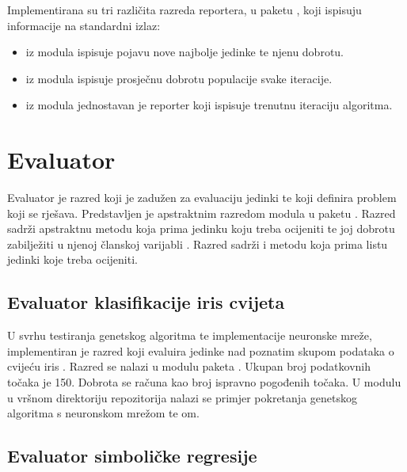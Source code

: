 \documentclass[times, utf8, zavrsni, numeric]{fer}
\begin{document}
Implementirana su tri različita razreda reportera, u paketu ,
koji ispisuju informacije na standardni izlaz:
\begin{itemize}
    \item {} iz modula
         ispisuje pojavu nove najbolje
        jedinke te njenu dobrotu.
    \item {} iz modula  ispisuje
        prosječnu dobrotu populacije svake iteracije.
    \item {} iz modula 
        jednostavan je reporter koji ispisuje trenutnu iteraciju algoritma.
\end{itemize}


\section{Evaluator}

Evaluator je razred koji je zadužen za evaluaciju jedinki te koji definira
problem koji se rješava. Predstavljen je apstraktnim razredom 
modula  u paketu . Razred sadrži apstraktnu
metodu  koja prima jedinku koju treba ocijeniti te joj dobrotu
zabilježiti u njenoj članskoj varijabli . Razred
 sadrži i metodu  koja prima listu
jedinki koje treba ocijeniti.


\subsection{Evaluator klasifikacije iris cvijeta}
U svrhu testiranja genetskog algoritma te implementacije neuronske mreže,
implementiran je razred  koji evaluira jedinke nad
poznatim skupom podataka o cvijeću iris . Razred se
nalazi u modulu  paketa . Ukupan
broj podatkovnih točaka  je 150. Dobrota se računa kao broj
ispravno pogođenih točaka. U modulu  u vršnom
direktoriju repozitorija nalazi se primjer pokretanja genetskog algoritma s
neuronskom mrežom te om.


\subsection{Evaluator simboličke regresije}
\end{document}
